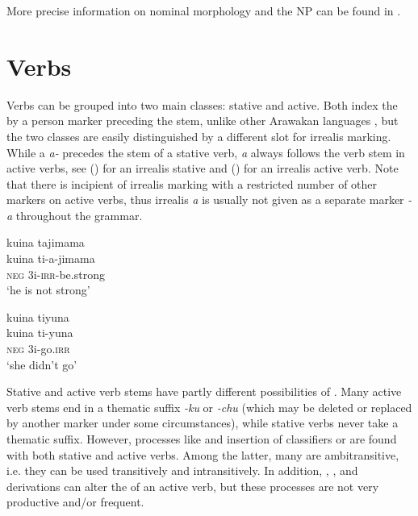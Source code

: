
More precise information on nominal morphology and the NP can be found in .

\section{Verbs}\label{sec:O_Verbs}

Verbs can be grouped into two main classes: stative and active.  Both index the  by a person marker preceding the stem, unlike other Arawakan languages \citep[cf.][86]{Aikhenvald1999}, but the two classes are easily distinguished by a different slot for irrealis marking. While a  \textit{a-} precedes the stem of a stative verb, \textit{a} always follows the verb stem in active verbs, see () for an irrealis stative and () for an irrealis active verb. Note that there is incipient  of irrealis marking with a restricted number of other markers on active verbs, thus irrealis \textit{a} is usually not given as a separate marker \textit{-a} throughout the grammar.

\newpage
\ea\label{ex:Sketch-Stat}
\begingl
\glpreamble kuina tajimama\\
\gla kuina ti-a-jimama\\
\glb \textsc{neg} 3i-\textsc{irr}-be.strong\\
\glft ‘he is not strong’\\
\endgl
\xe

\ea\label{ex:Sketch-Act}
\begingl
\glpreamble kuina tiyuna\\
\gla kuina ti-yuna\\
\glb \textsc{neg} 3i-go.\textsc{irr}\\
\glft ‘she didn’t go’\\
\endgl
\xe
{}

Stative and active verb stems have partly different possibilities of . Many active verb stems end in a thematic suffix \textit{-ku} or \textit{-chu} (which may be deleted or replaced by another marker under some circumstances), while stative verbs never take a thematic suffix. However, processes like  and insertion of classifiers or  are found with both stative and active verbs. Among the latter, many are ambitransitive, i.e. they can be used transitively and intransitively. In addition, , , and  derivations can alter the  of an active verb, but these processes are not very productive and/or frequent.


